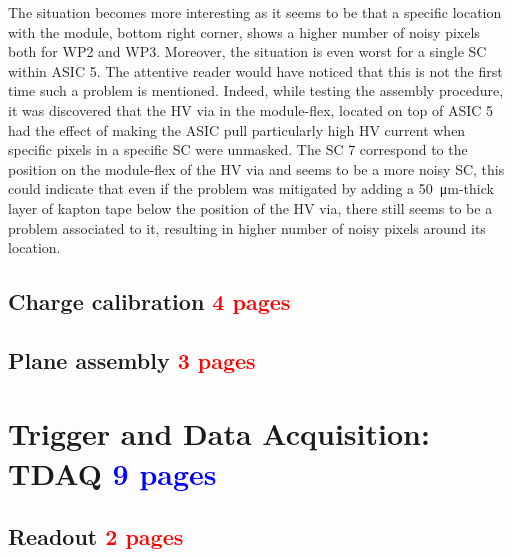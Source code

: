 			The situation becomes more interesting as it seems to be that a specific location with the module, bottom right corner, shows a higher number of noisy pixels both for WP2 and WP3. Moreover, the situation is even worst for a single SC within ASIC 5. The attentive reader would have noticed that this is not the first time such a problem is mentioned. Indeed, while testing the assembly procedure, it was discovered that the HV via in the module-flex, located on top of ASIC 5 had the effect of making the ASIC pull particularly high HV current when specific pixels in a specific SC were unmasked. The SC 7 correspond to the position on the module-flex of the HV via and seems to be a more noisy SC, this could indicate that even if the problem was mitigated by adding a \SI{50}{\micro\meter}-thick layer of kapton tape below the position of the HV via, there still seems to be a problem associated to it, resulting in higher number of noisy pixels around its location.     
			
			
		
		
		
		
		
		

		
		\subsection{Charge calibration \textcolor{red}{ 4 pages}} 
		
		\subsection{Plane assembly \textcolor{red}{ 3 pages}}
	
	
	
	
	
	\clearpage
	\section{Trigger and Data Acquisition: TDAQ \textcolor{blue}{ 9 pages}}
		\subsection{Readout\textcolor{red}{ 2 pages}}
